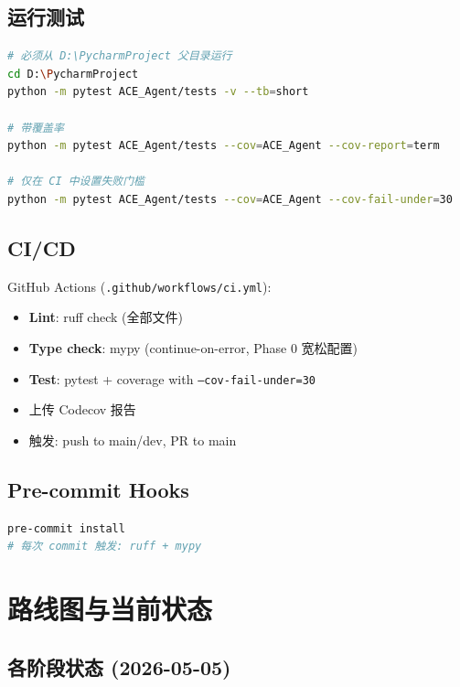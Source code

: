 \documentclass[12pt,a4paper]{article}
\begin{document}
\subsection{运行测试}

\begin{lstlisting}[language=bash]
# 必须从 D:\PycharmProject 父目录运行
cd D:\PycharmProject
python -m pytest ACE_Agent/tests -v --tb=short

# 带覆盖率
python -m pytest ACE_Agent/tests --cov=ACE_Agent --cov-report=term

# 仅在 CI 中设置失败门槛
python -m pytest ACE_Agent/tests --cov=ACE_Agent --cov-fail-under=30
\end{lstlisting}

\subsection{CI/CD}

GitHub Actions (\texttt{.github/workflows/ci.yml}):
\begin{itemize}[nosep]
    \item \textbf{Lint}: ruff check (全部文件)
    \item \textbf{Type check}: mypy (continue-on-error, Phase 0 宽松配置)
    \item \textbf{Test}: pytest + coverage with \texttt{--cov-fail-under=30}
    \item 上传 Codecov 报告
    \item 触发: push to main/dev, PR to main
\end{itemize}

\subsection{Pre-commit Hooks}

\begin{lstlisting}[language=bash]
pre-commit install
# 每次 commit 触发: ruff + mypy
\end{lstlisting}

\newpage

\section{路线图与当前状态}

\subsection{各阶段状态 (2026-05-05)}
\end{document}
